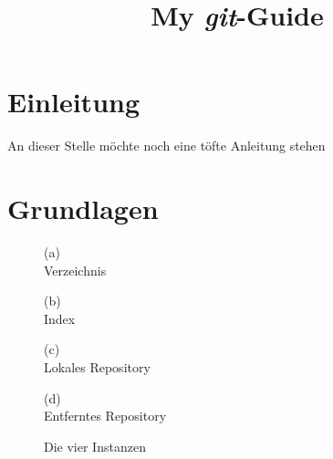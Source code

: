 
\usepackage{enumitem}
\usepackage{wasysym}
\usepackage{blindtext}
\usepackage{framed}
\usepackage{float}


\title{My \emph{git}-Guide}

\maketitle
\tableofcontents
\newpage
\section{Einleitung}
An dieser Stelle möchte noch eine töfte Anleitung stehen \smiley
\newpage

\section{Grundlagen}									%
\begin{figure}
\centering
\caption{Die vier Instanzen}
\begin{minipage}{0.24\textwidth}
	\begin{framed} 		
	\centering 
	(a)\\
	\vspace{0,3cm}
	Verzeichnis \\
	\phantom{Repository}
	\vspace{1cm}
	\end{framed} 
\end{minipage}
\begin{minipage}{0.24\textwidth}
	\begin{framed} 		
	\centering 
	(b)\\
	\vspace{0,3cm}
	Index \\
	\phantom{Repository}
	\vspace{1cm}
	\end{framed} 
\end{minipage}
\begin{minipage}{0.24\textwidth}
	\begin{framed} 		
	\centering 
	(c)\\
	\vspace{0,3cm}
	Lokales Repository
	\vspace{1cm} 
	\end{framed} 
\end{minipage}
\begin{minipage}{0.24\textwidth}
	\begin{framed} 		
	\centering 
	(d)\\
	\vspace{0,3cm}
	Entferntes Repository 
	\vspace{1cm}
	\end{framed} 
\end{minipage}
\end{figure}

